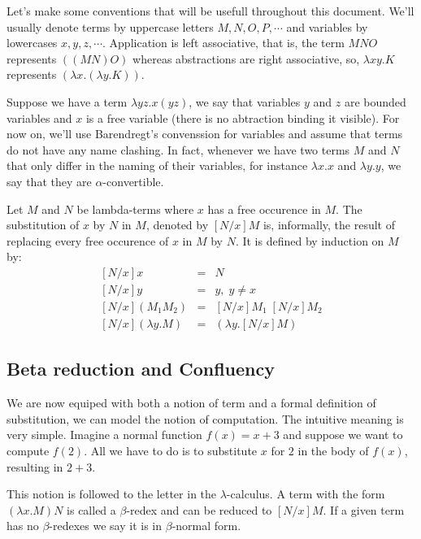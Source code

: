 Let's make some conventions that will be usefull throughout this document. We'll usually denote
terms by uppercase letters $M, N, O, P, \cdots$ and variables by lowercases $x, y, z, \cdots$.
Application is left associative, that is, the term $M N O$ represents $((M N) O)$ whereas
abstractions are right associative, so, $\lambda x y. K$ represents $(\lambda x . (\lambda y.K))$.

Suppose we have a term $\lambda yz.x(yz)$, we say that variables $y$ and $z$ are bounded variables
and $x$ is a free variable (there is no abtraction binding it visible). For now on, we'll 
use Barendregt's convenssion for variables and assume that terms do not have any name clashing.
In fact, whenever we have two terms $M$ and $N$ that only differ in the naming of their variables,
for instance $\lambda x . x$ and $\lambda y . y$, we say that they are $\alpha$-convertible.\\

\begin{mydef}[Substitution] Let $M$ and $N$ be lambda-terms where $x$ has a free occurence
in $M$. The substitution of $x$ by $N$ in $M$, denoted by $[N/x]M$ is, informally, the result
of replacing every free occurence of $x$ in $M$ by $N$. It is defined by induction on $M$ by:
\begin{eqnarray*}
   {[N/x]} x & = & N \\
   {[N/x]} y & = & y, \; y \neq x \\
   {[N/x]}(M_1 M_2) & = & {[N/x]M_1\; [N/x]M_2} \\
   {[N/x]}(\lambda y . M) & = & (\lambda y . {[N/x]M})
\end{eqnarray*}
\end{mydef}

\subsection{Beta reduction and Confluency}

We are now equiped with both a notion of term and a formal definition of substitution, we can
model the notion of computation. The intuitive meaning is very simple. Imagine a normal
function $f(x) = x + 3$ and suppose we want to compute $f(2)$. All we have to do is to
substitute $x$ for $2$ in the body of $f(x)$, resulting in $2+3$.

This notion is followed to the letter in the $\lambda$-calculus. A term with the form $(\lambda x . M)N$ is
called a $\beta$-redex and can be reduced to $[N/x]M$. If a given term has no $\beta$-redexes we say
it is in $\beta$-normal form.

